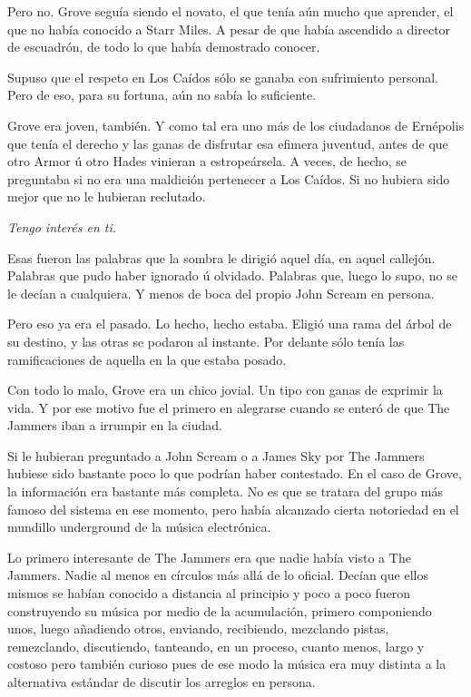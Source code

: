 Pero no. Grove seguía siendo el novato, el que tenía aún mucho que aprender, el que no había conocido a Starr Miles. A pesar de que había ascendido a director de escuadrón, de todo lo que había demostrado conocer.

Supuso que el respeto en Los Caídos sólo se ganaba con sufrimiento personal. Pero de eso, para su fortuna, aún no sabía lo suficiente.

Grove era joven, también. Y como tal era uno más de los ciudadanos de Ernépolis que tenía el derecho y las ganas de disfrutar esa efimera juventud, antes de que otro Armor ú otro Hades vinieran a estropeársela. A veces, de hecho, se preguntaba si no era una maldición pertenecer a Los Caídos. Si no hubiera sido mejor que no le hubieran reclutado.

\emph{Tengo interés en ti.}

Esas fueron las palabras que la sombra le dirigió aquel día, en aquel callejón. Palabras que pudo haber ignorado ú olvidado. Palabras que, luego lo supo, no se le decían a cualquiera. Y menos de boca del propio John Scream en persona.

Pero eso ya era el pasado. Lo hecho, hecho estaba. Eligió una rama del árbol de su destino, y las otras se podaron al instante. Por delante sólo tenía las ramificaciones de aquella en la que estaba posado.

Con todo lo malo, Grove era un chico jovial. Un tipo con ganas de exprimir la vida. Y por ese motivo fue el primero en alegrarse cuando se enteró de que The Jammers iban a irrumpir en la ciudad.

Si le hubieran preguntado a John Scream o a James Sky por The Jammers hubiese sido bastante poco lo que podrían haber contestado. En el caso de Grove, la información era bastante más completa. No es que se tratara del grupo más famoso del sistema en ese momento, pero había alcanzado cierta notoriedad en el mundillo underground de la música electrónica.

Lo primero interesante de The Jammers era que nadie había visto a The Jammers. Nadie al menos en círculos más allá de lo oficial. Decían que ellos mismos se habían conocido a distancia al principio y poco a poco fueron construyendo su música por medio de la acumulación, primero componiendo unos, luego añadiendo otros, enviando, recibiendo, mezclando pistas, remezclando, discutiendo, tanteando, en un proceso, cuanto menos, largo y costoso pero también curioso pues de ese modo la música era muy distinta a la alternativa estándar de discutir los arreglos en persona.

